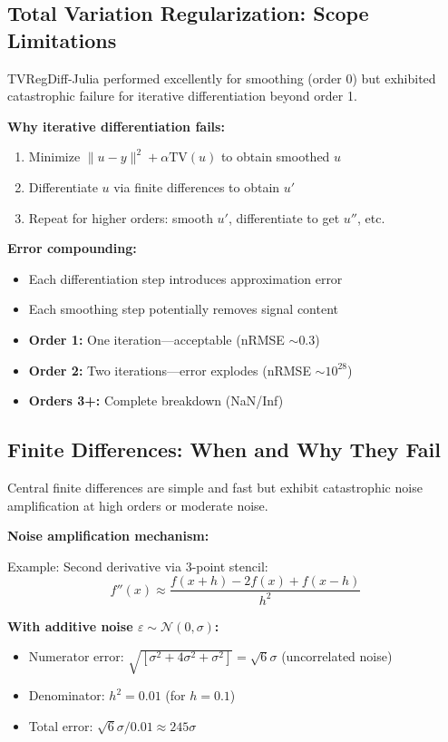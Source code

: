 \subsection{Total Variation Regularization: Scope Limitations}
\label{sec:tv_limitations}

TVRegDiff-Julia performed excellently for smoothing (order 0) but exhibited catastrophic failure for iterative differentiation beyond order 1.

\textbf{Why iterative differentiation fails:}

\begin{enumerate}
    \item Minimize $\|u - y\|^2 + \alpha \text{TV}(u)$ to obtain smoothed $u$
    \item Differentiate $u$ via finite differences to obtain $u'$
    \item Repeat for higher orders: smooth $u'$, differentiate to get $u''$, etc.
\end{enumerate}

\textbf{Error compounding:}
\begin{itemize}
    \item Each differentiation step introduces approximation error
    \item Each smoothing step potentially removes signal content
    \item \textbf{Order 1:} One iteration---acceptable (nRMSE $\sim 0.3$)
    \item \textbf{Order 2:} Two iterations---error explodes (nRMSE $\sim 10^{28}$)
    \item \textbf{Orders 3+:} Complete breakdown (NaN/Inf)
\end{itemize}

\subsection{Finite Differences: When and Why They Fail}
\label{sec:fd_failure}

Central finite differences are simple and fast but exhibit catastrophic noise amplification at high orders or moderate noise.

\textbf{Noise amplification mechanism:}

Example: Second derivative via 3-point stencil:
\begin{equation}
f''(x) \approx \frac{f(x+h) - 2f(x) + f(x-h)}{h^2}
\end{equation}

\textbf{With additive noise $\varepsilon \sim \mathcal{N}(0, \sigma)$:}
\begin{itemize}
    \item Numerator error: $\sqrt{[\sigma^2 + 4\sigma^2 + \sigma^2]} = \sqrt{6} \sigma$ (uncorrelated noise)
    \item Denominator: $h^2 = 0.01$ (for $h=0.1$)
    \item Total error: $\sqrt{6} \sigma / 0.01 \approx 245 \sigma$
\end{itemize}

